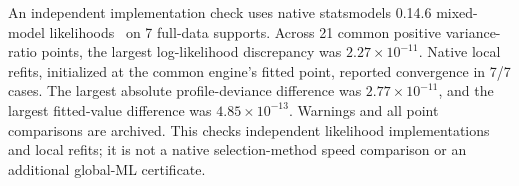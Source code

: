 An independent implementation check uses native statsmodels 0.14.6
mixed-model likelihoods~\cite{statsmodels} on 7 full-data supports. Across 21
common positive variance-ratio points, the largest log-likelihood discrepancy
was $2.27\times10^{-11}$. Native local refits, initialized at the common engine's fitted
point, reported convergence in 7/7 cases. The largest absolute
profile-deviance difference was $2.77\times10^{-11}$, and the largest fitted-value
difference was $4.85\times10^{-13}$. Warnings and all point comparisons are archived.
This checks independent likelihood implementations and local refits; it is
not a native selection-method speed comparison or an additional global-ML certificate.
